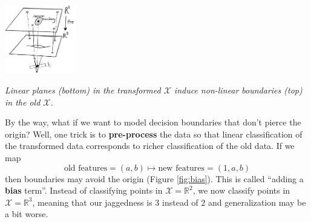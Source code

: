 \documentclass[openany, notitlepage, justified]{tufte-book}
\newcommand{\RR}{\mathbb{R}}
\newcommand{\Xx}{\mathcal{X}}
\begin{document}
            \begin{marginfigure}
                \centering
                \includegraphics[height=3.0cm]{transform-two-three}
                \caption{\emph{
                    Linear planes (bottom) in the transformed $\Xx$ induce
                    non-linear boundaries (top) in the old $\Xx$.
                }}
            \end{marginfigure}
            By the way, what if
            we want
            to model decision boundaries that don't pierce the origin?
            Well, one trick is to \textbf{pre-process} the data so that linear
            classification of the transformed data corresponds to richer
            classification of the old data.  If we map
            $$
                \text{old features} = (a,b)
                \mapsto
                \text{new features} = (1, a, b)
            $$
            then boundaries may avoid the origin (Figure
            \ref{fig:bias}).  This is called ``adding a \textbf{bias} term''.
            Instead of classifying points in $\Xx=\RR^2$, we now classify
            points in $\Xx=\RR^3$, meaning that our jaggedness is $3$ instead
            of $2$ and generalization may be a bit worse.
\end{document}
